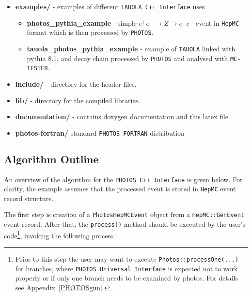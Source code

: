 \documentclass[]{Photos_interface_design}
\begin{document}
\begin{itemize}
  \item {\bf examples/ } - examples of different {\tt TAUOLA C++ Interface} uses
    \begin{itemize}
    \item {\bf photos\_pythia\_example} - simple $e^+e^- \rightarrow Z \rightarrow e^+e^-$ event in
	{\tt HepMC} format which is then processed by {\tt PHOTOS}.
    \item {\bf tauola\_photos\_pythia\_example } - example of  {\tt TAUOLA} linked with pythia 8.1,
	and decay chain processed by {\tt PHOTOS} and analysed with  {\tt MC-TESTER}.
    \end{itemize}   
  \item {\bf include/} - directory for the header files.
  \item {\bf lib/ } - directory for the compiled  libraries. 
  \item {\bf documentation/ } - contains doxygen documentation and this latex file.
  \item {\bf photos-fortran/ } standard {\tt PHOTOS FORTRAN} distribution
\end{itemize}

\subsection{Algorithm Outline}
\label{sect:Outline}

An overview of the algorithm for  the {\tt PHOTOS C++ Interface} is
given below. For clarity, the example assumes that the processed event
is stored in {\tt HepMC} event record structure.

The first step is creation of a {\tt PhotosHepMCEvent} object from
a {\tt HepMC::GenEvent} event record. After that, the {\tt process()} method should
be executed by the user's code\footnote{Prior to this step
the user may want to execute {\tt Photos::processOne(...)} for branches,
where {\tt PHOTOS Universal Interface} is expected not to work properly
or if only one branch needs to be examined by photos. For details see Appendix~\ref{PHOTOSgun}.
}, invoking the following process:
\end{document}
